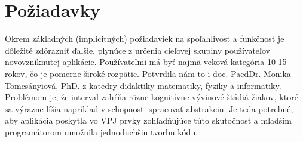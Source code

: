 \section{Požiadavky}
Okrem základných (implicitných) požiadaviek na spoľahlivosť a funkčnosť je dôležité zdôrazniť ďalšie, plynúce z určenia cieľovej skupiny používateľov novovzniknutej aplikácie. Používateľmi má byť najmä veková kategória 10-15 rokov, čo je pomerne široké rozpätie. Potvrdila nám to i doc. PaedDr. Monika Tomcsányiová, PhD. z katedry didaktiky matematiky, fyziky a informatiky. Problémom je, že interval zahŕňa rôzne kognitívne vývinové štádiá žiakov, ktoré sa výrazne líšia napríklad v schopnosti spracovať abstrakciu. Je teda potrebné, aby aplikácia poskytla vo VPJ prvky zohľadňujúce túto skutočnosť a mladším programátorom umožnila jednoduchšiu tvorbu kódu.